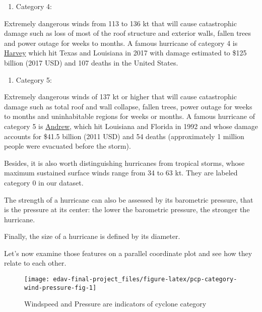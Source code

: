\documentclass[]{book}
\providecommand{\tightlist}{%
  \setlength{\itemsep}{0pt}\setlength{\parskip}{0pt}}
\begin{document}
\begin{enumerate}
\def\labelenumi{(\arabic{enumi})}
\setcounter{enumi}{3}
\tightlist
\item
  Category 4:
\end{enumerate}

Extremely dangerous winds from 113 to 136 kt that will cause catastrophic damage such as loss of most of the roof structure and exterior walls, fallen trees and power outage for weeks to months. A famous hurricane of category 4 is \href{https://en.wikipedia.org/wiki/Hurricane_Harvey}{Harvey} which hit Texas and Louisiana in 2017 with damage estimated to \$125 billion (2017 USD) and 107 deaths in the United States.

\begin{enumerate}
\def\labelenumi{(\arabic{enumi})}
\setcounter{enumi}{4}
\tightlist
\item
  Category 5:
\end{enumerate}

Extremely dangerous winds of 137 kt or higher that will cause catastrophic damage such as total roof and wall collapse, fallen trees, power outage for weeks to months and uninhabitable regions for weeks or months. A famous hurricane of category 5 is \href{https://en.wikipedia.org/wiki/Hurricane_Andrew}{Andrew}, which hit Louisiana and Florida in 1992 and whose damage accounts for \$41.5 billion (2011 USD) and 54 deaths (approximately 1 million people were evacuated before the storm).

Besides, it is also worth distinguishing hurricanes from tropical storms, whose maximum sustained surface winds range from 34 to 63 kt. They are labeled category 0 in our dataset.

The strength of a hurricane can also be assessed by its barometric pressure, that is the pressure at its center: the lower the barometric pressure, the stronger the hurricane.

Finally, the size of a hurricane is defined by its diameter.

Let's now examine those features on a parallel coordinate plot and see how they relate to each other.

\begin{figure}

{\centering \texttt{[image: edav-final-project\_files/figure-latex/pcp-category-wind-pressure-fig-1]} 

}

\caption{Windspeed and Pressure are indicators of cyclone category}\label{fig:pcp-category-wind-pressure-fig}
\end{figure}
\end{document}
